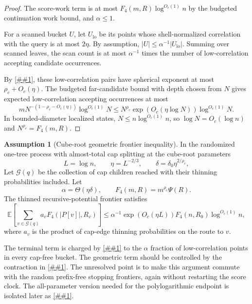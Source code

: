\documentclass[10pt]{article}
\newcommand{\cref}[1]{\ref{##1}}
\theoremstyle{definition}
\newtheorem{assumption}[theorem]{Assumption}
\newcommand{\E}{\mathbb{E}}
\begin{document}
\begin{proof}
   The score-work term is at most $F_4(m,R)\log^{O_c(1)}n$ by the budgeted continuation work bound, and $\alpha\le1$.

   For a scanned bucket $U$, let $U_{\mathrm{lo}}$ be its points whose shell-normalized correlation with the query is at most $2\eta$. By assumption, $|U|\le\alpha^{-1}|U_{\mathrm{lo}}|$. Summing over scanned leaves, the scan count is at most $\alpha^{-1}$ times the number of low-correlation accepting candidate occurrences.

   By \cref{lem:rho-stability}, these low-correlation pairs have spherical exponent at most $\rho_c+O_c(\eta)$. The budgeted far-candidate bound with depth chosen from $N$ gives expected low-correlation accepting occurrences at most
   \[
      mN^{-(1-\rho_c-O_c(\eta))}\log^{O_c(1)}N
      \le
      N^{\rho_c}\exp(O_c(\eta\log N))\log^{O_c(1)}N.
   \]
   In bounded-diameter localized states, $N\le n\log^{O_c(1)}n$, so $\log N=O_c(\log n)$ and $N^{\rho_c}=F_4(m,R)$.
\end{proof}

\begin{assumption}[Cube-root geometric frontier inequality]\label{asm:mixed-operator}
   In the randomized one-tree process with almost-total cap splitting at the cube-root parameters
   \[
      L=\log n,
      \qquad
      \eta=L^{-2/3},
      \qquad
      \delta=\delta_0\eta^{2/\rho_c},
   \]
   Let $\mathcal G(q)$ be the collection of cap children reached with their thinning probabilities included. Let
   \[
      \alpha=\Theta(\eta\delta),
      \qquad
      F_4(m,R)=m^{\rho_c}\Psi(R).
   \]
   The thinned recursive-potential frontier satisfies
   \[
      \E\left[
         \sum_{v\in\mathcal G(q)} a_vF_4(|P[v]|,R_v)
      \right]
      \le
      \alpha^{-1}
      \exp(O_c(\eta L))
      F_4(n,R_0)\log^{O_c(1)}n,
   \]
   where $a_v$ is the product of cap-edge thinning probabilities on the route to $v$.
\end{assumption}

The terminal term is charged by \cref{lem:cap-free-scan-accounting} to the $\alpha$ fraction of low-correlation points in every cap-free bucket. The geometric term should be controlled by the contraction in \cref{lem:thin-cap-contraction}. The unresolved point is to make this argument commute with the random prefix-free stopping frontiers, again without restarting the score clock. The all-parameter version needed for the polylogarithmic endpoint is isolated later as \cref{asm:mixed-continuation-operator}.
\end{document}
